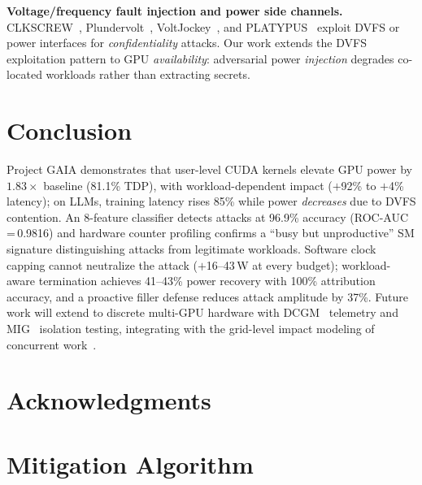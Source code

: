\documentclass[letterpaper,twocolumn,10pt]{article}
\begin{document}
\textbf{Voltage/frequency fault injection and power side channels.}
CLKSCREW~\cite{tang2017}, Plundervolt~\cite{murdock2020},
VoltJockey~\cite{qiu2019}, and PLATYPUS~\cite{lipp2021} exploit
DVFS or power interfaces for \emph{confidentiality} attacks.
Our work extends the DVFS exploitation pattern to GPU
\emph{availability}: adversarial power \emph{injection} degrades
co-located workloads rather than extracting secrets.


\section{Conclusion}
\label{sec:conclusion}

Project GAIA demonstrates that user-level CUDA kernels elevate GPU
power by $1.83\times$ baseline (81.1\% TDP), with workload-dependent
impact ($+$92\% to $+$4\% latency); on LLMs, training latency
rises 85\% while power \emph{decreases} due to DVFS contention.
An 8-feature classifier detects attacks at 96.9\% accuracy
(ROC-AUC\,=\,0.9816) and hardware counter profiling confirms a
``busy but unproductive'' SM signature distinguishing attacks from
legitimate workloads.  Software clock capping cannot neutralize the
attack ($+$16--43\,W at every budget); workload-aware termination
achieves 41--43\% power recovery with 100\% attribution accuracy,
and a proactive filler defense reduces attack amplitude by 37\%.
Future work will extend to discrete multi-GPU hardware with
DCGM~\cite{dcgm2026} telemetry and MIG~\cite{nvidia_mig2024}
isolation testing, integrating with the grid-level impact modeling
of concurrent work~\cite{ji2026,soltan2018}.

\section*{Acknowledgments}

{\footnotesize


}

\appendix
\section{Mitigation Algorithm}
\label{app:algorithm}
\end{document}
